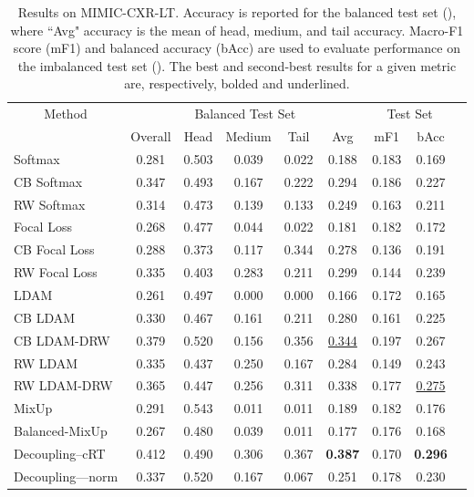 \documentclass[runningheads]{llncs}
\begin{document}
\begin{table}[!ht]
    \centering
\renewcommand{\arraystretch}{1.1}
    \caption{Results on MIMIC-CXR-LT. Accuracy is reported for the balanced test set (), where ``Avg" accuracy is the mean of head, medium, and tail accuracy. Macro-F1 score (mF1) and balanced accuracy (bAcc) are used to evaluate performance on the imbalanced test set (). The best and second-best results for a given metric are, respectively, bolded and underlined.}
    \begin{tabular}{@{}lcccccccc@{}}
        \toprule
        \multicolumn{1}{c}{Method} & \multicolumn{5}{c}{Balanced Test Set} & \multicolumn{2}{c}{Test Set} \\
        \cmidrule(lr){2-6} \cmidrule(lr){7-8}
         & Overall & Head & Medium & Tail & Avg & mF1 & bAcc \\
\midrule
            Softmax & 0.281 & 0.503 & 0.039 & 0.022 & 0.188 & 0.183 & 0.169 \\
            CB Softmax & 0.347 & 0.493 & 0.167 & 0.222 & 0.294 & 0.186 & 0.227 \\
            RW Softmax & 0.314 & 0.473 & 0.139 & 0.133 & 0.249 & 0.163 & 0.211 \\
            Focal Loss & 0.268 & 0.477 & 0.044 & 0.022 & 0.181 & 0.182 & 0.172 \\
            CB Focal Loss & 0.288 & 0.373 & 0.117 & 0.344 & 0.278 & 0.136 & 0.191 \\
            RW Focal Loss & 0.335 & 0.403 & 0.283 & 0.211 & 0.299 & 0.144 & 0.239 \\
            LDAM & 0.261 & 0.497 & 0.000   & 0.000   & 0.166 & 0.172 & 0.165 \\
            CB LDAM & 0.330  & 0.467 & 0.161 & 0.211 & 0.280  & 0.161 & 0.225 \\
            CB LDAM-DRW & 0.379 & 0.520  & 0.156 & 0.356 & \underline{0.344} & 0.197 & 0.267 \\
            RW LDAM & 0.335 & 0.437 & 0.250  & 0.167 & 0.284 & 0.149 & 0.243 \\
            RW LDAM-DRW & 0.365 & 0.447 & 0.256 & 0.311 & 0.338 & 0.177 & \underline{0.275} \\
            MixUp & 0.291 & 0.543 & 0.011 & 0.011 & 0.189 & 0.182 & 0.176 \\
            Balanced-MixUp & 0.267 & 0.480  & 0.039 & 0.011 & 0.177 & 0.176 & 0.168 \\
            Decoupling--cRT & 0.412 & 0.490  & 0.306 & 0.367 & \textbf{0.387} & 0.170  & \textbf{0.296} \\
            Decoupling---norm & 0.337 & 0.520  & 0.167 & 0.067 & 0.251 & 0.178 &         0.230  \\
        \bottomrule
    \end{tabular}
    \label{results:mimic}
\end{table}
\end{document}
